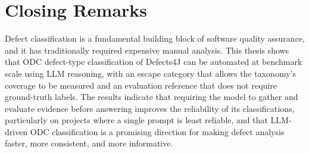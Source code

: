 \documentclass{iutbscthesis}
\begin{document}
\section{Closing Remarks}

Defect classification is a fundamental building block of software quality assurance, and it has traditionally required expensive manual analysis. This thesis shows that ODC defect-type classification of Defects4J can be automated at benchmark scale using LLM reasoning, with an escape category that allows the taxonomy's coverage to be measured and an evaluation reference that does not require ground-truth labels. The results indicate that requiring the model to gather and evaluate evidence before answering improves the reliability of its classifications, particularly on projects where a single prompt is least reliable, and that LLM-driven ODC classification is a promising direction for making defect analysis faster, more consistent, and more informative.



\printbib
\end{document}
